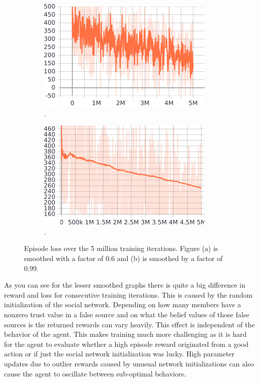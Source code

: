 \documentclass[11pt, a4paper]{article}
\begin{document}
\begin{figure}[h]
	\centering
	\begin{subfigure}{0.4\textwidth}
		\centering
		\includegraphics[width=\linewidth]{loss_notSmoothed.png}  
		\caption{.}
	\end{subfigure}
	\begin{subfigure}{0.4\textwidth}
		\centering
		\includegraphics[width=\linewidth]{loss_smoothed.png}  
		\caption{.}
	\end{subfigure}
	\caption{\label{fig:loss_tb}Episode loss over the 5 million training iterations. Figure (a) is smoothed with a factor of 0.6 and (b) is smoothed by a factor of 0.99.}
\end{figure}

As you can see for the lesser smoothed graphs there is quite a big difference in reward and loss for consecutive training iterations. This is caused by the random initialization of the social network. Depending on how many members have a nonzero trust value in a false source and on what the belief values of those false sources is the returned rewards can vary heavily. This effect is independent of the behavior of the agent. This makes training much more challenging as it is hard for the agent to evaluate whether a high episode reward originated from a good action or if just the social network initialization was lucky. High parameter updates due to outlier rewards caused by unusual network initializations can also cause the agent to oscillate between sub-optimal behaviors.
\end{document}
